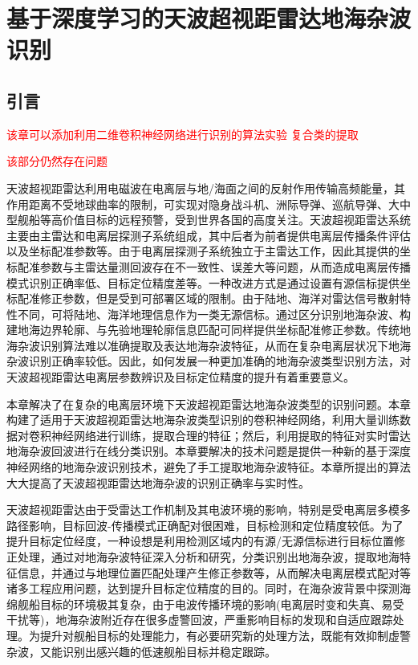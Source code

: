 \chapter{基于深度学习的天波超视距雷达地海杂波识别}
\section{引言}

\textcolor{red}{该章可以添加利用二维卷积神经网络进行识别的算法实验}
\textcolor{red}{复合类的提取}

\textcolor{red}{该部分仍然存在问题}

天波超视距雷达利用电磁波在电离层与地/海面之间的反射作用传输高频能量，其作用距离不受地球曲率的限制，可实现对隐身战斗机、洲际导弹、巡航导弹、大中型舰船等高价值目标的远程预警，受到世界各国的高度关注。天波超视距雷达系统主要由主雷达和电离层探测子系统组成，其中后者为前者提供电离层传播条件评估以及坐标配准参数等。由于电离层探测子系统独立于主雷达工作，因此其提供的坐标配准参数与主雷达量测回波存在不一致性、误差大等问题，从而造成电离层传播模式识别正确率低、目标定位精度差等。一种改进方式是通过设置有源信标提供坐标配准修正参数，但是受到可部署区域的限制。由于陆地、海洋对雷达信号散射特性不同，可将陆地、海洋地理信息作为一类无源信标。通过区分识别地海杂波、构建地海边界轮廓、与先验地理轮廓信息匹配可同样提供坐标配准修正参数。传统地海杂波识别算法难以准确提取及表达地海杂波特征，从而在复杂电离层状况下地海杂波识别正确率较低。因此，如何发展一种更加准确的地海杂波类型识别方法，对天波超视距雷达电离层参数辨识及目标定位精度的提升有着重要意义。

本章解决了在复杂的电离层环境下天波超视距雷达地海杂波类型的识别问题。本章构建了适用于天波超视距雷达地海杂波类型识别的卷积神经网络，利用大量训练数据对卷积神经网络进行训练，提取合理的特征；然后，利用提取的特征对实时雷达地海杂波回波进行在线分类识别。本章要解决的技术问题是提供一种新的基于深度神经网络的地海杂波识别技术，避免了手工提取地海杂波特征。本章所提出的算法大大提高了天波超视距雷达地海杂波的识别正确率与实时性。

天波超视距雷达由于受雷达工作机制及其电波环境的影响，特别是受电离层多模多路径影响，目标回波-传播模式正确配对很困难，目标检测和定位精度较低。为了提升目标定位经度，一种设想是利用检测区域内的有源/无源信标进行目标位置修正处理，通过对地海杂波特征深入分析和研究，分类识别出地海杂波，提取地海特征信息，并通过与地理位置匹配处理产生修正参数等，从而解决电离层模式配对等诸多工程应用问题，达到提升目标定位精度的目的。同时，在海杂波背景中探测海绵舰船目标的环境极其复杂，由于电波传播环境的影响(电离层时变和失真、易受干扰等)，地海杂波附近存在很多虚警回波，严重影响目标的发现和自适应跟踪处理。为提升对舰船目标的处理能力，有必要研究新的处理方法，既能有效抑制虚警杂波，又能识别出感兴趣的低速舰船目标并稳定跟踪。

